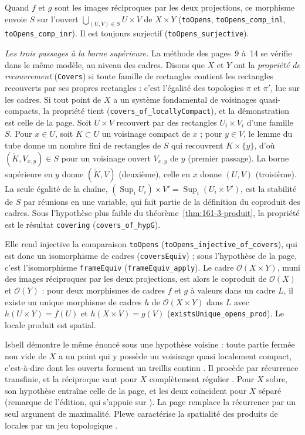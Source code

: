 Quand $f$ et $g$ sont les images réciproques par les deux projections, ce morphisme envoie $S$ sur l'ouvert $\bigcup_{(U, V) \in S} U \times V$ de $X \times Y$ (\texttt{toOpens}, \texttt{toOpens\_comp\_inl}, \texttt{toOpens\_comp\_inr}). Il est toujours surjectif (\texttt{toOpens\_surjective}).

\noindent\emph{Les trois passages à la borne supérieure.} La méthode des pages~9 à~14 se vérifie dans le même modèle, au niveau des cadres. Disons que $X$ et $Y$ ont la \emph{propriété de recouvrement} (\texttt{Covers}) si toute famille de rectangles contient les rectangles recouverts par ses propres rectangles : c'est l'égalité des topologies $\pi$ et $\pi'$, lue sur les cadres. Si tout point de $X$ a un système fondamental de voisinages quasi-compacts, la propriété tient (\texttt{covers\_of\_locallyCompact}), et la démonstration est celle de la page. Soit $U \times V$ recouvert par des rectangles $U_i \times V_i$ d'une famille $S$. Pour $x \in U$, soit $K \subset U$ un voisinage compact de $x$ ; pour $y \in V$, le lemme du tube donne un nombre fini de rectangles de $S$ qui recouvrent $K \times \{y\}$, d'où $(\mathring K, V_{x,y}) \in S$ pour un voisinage ouvert $V_{x,y}$ de $y$ (premier passage). La borne supérieure en $y$ donne $(\mathring K, V)$ (deuxième), celle en $x$ donne $(U, V)$ (troisième). La seule égalité de la chaîne, $(\operatorname{Sup}_i U_i) \times V' = \operatorname{Sup}_i (U_i \times V')$, est la stabilité de $S$ par réunions en une variable, qui fait partie de la définition du coproduit des cadres. Sous l'hypothèse plus faible du théorème~\ref{thm:161-3-produit}, la propriété est le résultat \texttt{covering} (\texttt{covers\_of\_hypG}).

Elle rend injective la comparaison \texttt{toOpens} (\texttt{toOpens\_injective\_\allowbreak of\_covers}), qui est donc un isomorphisme de cadres (\texttt{coversEquiv}) ; sous l'hypothèse de la page, c'est l'isomorphisme \texttt{frameEquiv} (\texttt{frameEquiv\_apply}). Le cadre $\mathcal O(X \times Y)$, muni des images réciproques par les deux projections, est alors le coproduit de $\mathcal O(X)$ et $\mathcal O(Y)$ : pour deux morphismes de cadres $f$ et $g$ à valeurs dans un cadre $L$, il existe un unique morphisme de cadres $h$ de $\mathcal O(X \times Y)$ dans $L$ avec $h(U \times Y) = f(U)$ et $h(X \times V) = g(V)$ (\texttt{existsUnique\_opens\_prod}). Le locale produit est spatial.

\begin{remarque}
Isbell démontre le même énoncé sous une hypothèse voisine : toute partie fermée non vide de $X$ a un point qui y possède un voisinage quasi localement compact, c'est-à-dire dont les ouverts forment un treillis continu \cite{gierz2003}. Il procède par récurrence transfinie, et la réciproque vaut pour $X$ complètement régulier \cite[th.~1 et~4]{isbell1981}. Pour $X$ sobre, son hypothèse entraîne celle de la page, et les deux coïncident pour $X$ séparé (remarque de l'édition, qui s'appuie sur \cite[cor.~4.6]{hofmannlawson1978}). La page remplace la récurrence par un seul argument de maximalité. Plewe caractérise la spatialité des produits de locales par un jeu topologique \cite{plewe1996}.
\end{remarque}

